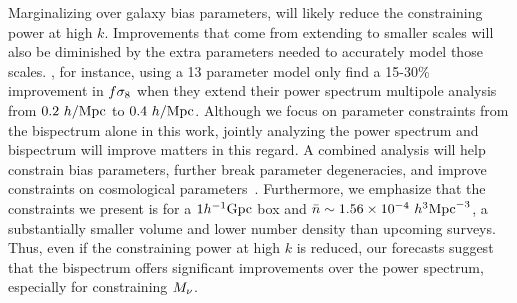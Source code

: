 Marginalizing over galaxy bias parameters, will likely reduce the constraining 
power at high $k$. 
Improvements that come from extending to smaller scales will also be diminished 
by the extra parameters needed to accurately model those scales. \cite{hand2017}, 
for instance, using a 13 parameter model only find a 15-30\% improvement in 
$f\sigma_8$ when they extend their power spectrum multipole analysis from 
$0.2~h/{\rm Mpc}$ to $0.4~h/{\rm Mpc}$. Although we focus on parameter constraints from 
the bispectrum alone in this work, jointly analyzing the power spectrum and 
bispectrum will improve matters in this regard. A combined analysis will help 
constrain bias parameters, further break parameter degeneracies, 
and improve constraints on cosmological parameters~\citep{sefusatti2006, yankelevich2019, chudaykin2019, coulton2019}.
Furthermore, we emphasize that the constraints we present is for a $1h^{-1}{\rm Gpc}$ 
box and $\bar{n} \sim 1.56 \times 10^{-4}~h^3{\rm Mpc}^{-3}$, a substantially 
smaller volume and lower number density than upcoming surveys. 
Thus, even if the constraining 
power at high $k$ is reduced, our forecasts suggest that the bispectrum offers 
significant improvements over the power spectrum, especially for constraining $M_\nu$. 
